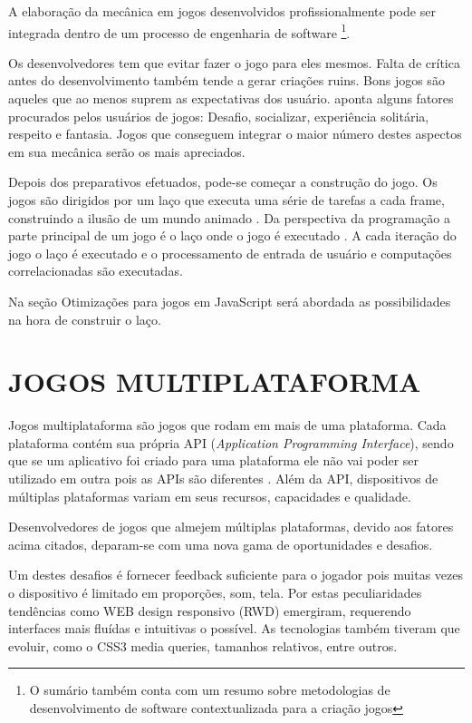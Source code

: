 A elaboração da mecânica em jogos desenvolvidos profissionalmente
pode ser integrada dentro de um processo de engenharia de software
\footnote{O sumário também conta com um resumo sobre metodologias de
desenvolvimento de software contextualizada para a criação jogos}.

Os desenvolvedores tem que evitar fazer o jogo para eles mesmos.
Falta de crítica antes do desenvolvimento também tende a gerar criações ruins.
Bons jogos são aqueles que ao menos suprem as expectativas dos usuário.
\cite{indieGamesLemes} aponta alguns fatores procurados pelos usuários
de jogos: Desafio, socializar, experiência solitária, respeito e
fantasia. Jogos que conseguem integrar o maior número destes aspectos 
em sua mecânica serão os mais apreciados.

Depois dos preparativos efetuados, pode-se começar a construção
do jogo. Os jogos são dirigidos por um laço que executa uma série
de tarefas a cada frame, construindo a ilusão de um mundo animado
\autocite[pp. 31]{gwt}. Da perspectiva da programação a parte
principal de um jogo é o laço onde o jogo é executado \autocite[pp.
17]{crossPlatformMobileGameDevelopment}. A cada iteração do jogo
o laço é executado e o processamento de entrada de usuário e
computações correlacionadas são executadas.

Na seção Otimizações para jogos em JavaScript será abordada as
possibilidades na hora de construir o laço.

\section{JOGOS MULTIPLATAFORMA}

Jogos multiplataforma são jogos que rodam em mais de uma plataforma.
Cada plataforma contém sua própria API (\textit{Application
Programming Interface}), sendo que se um aplicativo foi criado para
uma plataforma ele não vai poder ser utilizado em outra pois as APIs
são diferentes \autocite{crossPlatformMobileGameDevelopment}. Além da
API, dispositivos de múltiplas plataformas variam em seus recursos,
capacidades e qualidade.

Desenvolvedores de jogos que almejem múltiplas plataformas, devido aos
fatores acima citados, deparam-se com uma nova gama de oportunidades e
desafios.

Um destes desafios é fornecer feedback suficiente para o jogador pois
muitas vezes o dispositivo é limitado em proporções, som, tela.
Por estas peculiaridades tendências como WEB design responsivo (RWD)
emergiram, requerendo interfaces mais fluídas e intuitivas o possível.
As tecnologias também tiveram que evoluir, como o CSS3 media queries,
tamanhos relativos, entre outros.

